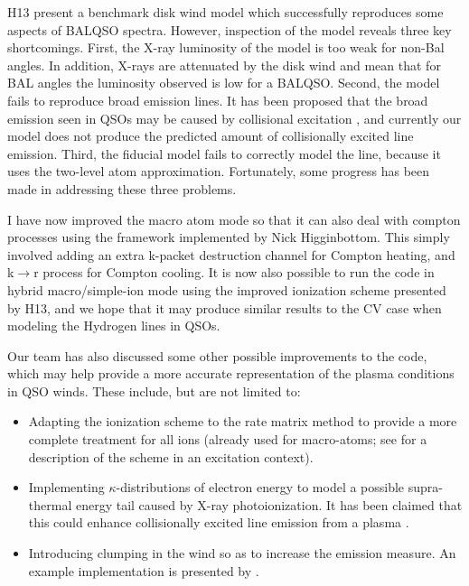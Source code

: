 \documentclass[useAMS,usenatbib,onecolumn]{mn2e2}
\begin{document}
H13 present a benchmark disk wind model
which successfully reproduces some aspects of BALQSO spectra. However, inspection
of the model reveals three key shortcomings. First, the X-ray luminosity of the model
is too weak for non-Bal angles. In addition,
X-rays are attenuated by the disk wind and mean that for BAL angles the luminosity observed
is low for a BALQSO. Second, the model fails to reproduce broad emission lines. 
It has been proposed that the broad emission seen in QSOs may be caused by collisional excitation \citep{MCGV95},
and currently our model does not produce the predicted amount of collisionally excited line emission. 
Third, the fiducial model fails to correctly model the \la line, because
it uses the two-level atom approximation.
Fortunately, some progress has been made in addressing these three problems.

I have now improved the macro atom mode so that it can also deal
with compton processes using the framework implemented by Nick Higginbottom.
This simply involved adding an extra k-packet destruction channel for Compton 
heating, and k$\rightarrow$r process for Compton cooling. 
It is now also possible to run the code in hybrid macro/simple-ion mode
using the improved ionization scheme presented by H13, and 
we hope that it may produce similar results to the CV case
when modeling the Hydrogen lines in QSOs.

Our team has also discussed some other possible improvements to the code,
which may help provide a more accurate representation of
the plasma conditions in QSO winds. These include, but are not limited to:
\begin{itemize}
	\item Adapting the ionization scheme to the rate matrix method to provide a more complete treatment for all ions (already used for macro-atoms; see \citealt{kerzendorfsim} for a description of the scheme in an excitation context).
	\item Implementing $\kappa$-distributions of electron energy to model a possible supra-thermal
energy tail caused by X-ray photoionization. It has been claimed that this could enhance collisionally excited line emission from a plasma \citep{HB14}.
	\item Introducing clumping in the wind so as to increase the emission measure. An example implementation is presented by 
	\cite{stalevski2013}.
\end{itemize}
\end{document}
